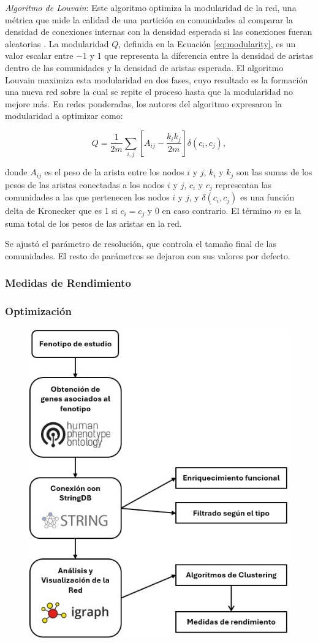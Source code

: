 \textit{Algoritmo de Louvain}: Este algoritmo optimiza la modularidad de la red, una métrica que mide la calidad de una partición en comunidades al comparar la densidad de conexiones internas con la densidad esperada si las conexiones fueran aleatorias \cite{Blondel2008Louvain}. La modularidad \( Q \), definida en la Ecuación \ref{eq:modularity}, es un valor escalar entre \(-1\) y \(1\) que representa la diferencia entre la densidad de aristas dentro de las comunidades y la densidad de aristas esperada. El algoritmo Louvain maximiza esta modularidad en dos fases, cuyo resultado es la formación una nueva red sobre la cual se repite el proceso hasta que la modularidad no mejore más. En redes ponderadas, los autores del algoritmo expresaron la modularidad a optimizar como:

\begin{equation}
	\label{eq:modularity}
	Q = \frac{1}{2m} \sum_{i,j} \left[ A_{ij} - \frac{k_i k_j}{2m} \right] \delta(c_i, c_j),
\end{equation}

\noindent donde \( A_{ij} \) es el peso de la arista entre los nodos \( i \) y \( j \), \( k_i \) y \( k_j \) son las sumas de los pesos de las aristas conectadas a los nodos \( i \) y \( j \), \( c_i \) y \( c_j \) representan las comunidades a las que pertenecen los nodos \( i \) y \( j \), y \( \delta(c_i, c_j) \) es una función delta de Kronecker que es 1 si \( c_i = c_j \) y 0 en caso contrario. El término \( m \) es la suma total de los pesos de las aristas en la red.

\noindent Se ajustó el parámetro de resolución, que controla el tamaño final de las comunidades. El resto de parámetros se dejaron con sus valores por defecto.

\subsubsection*{Medidas de Rendimiento}

\subsubsection*{Optimización}

\begin{figure}[h]
	\centering
	\includegraphics[width=0.75\linewidth]{figures/methods/flujo_trabajo.png}
	\caption{}
	\label{fig:flujo_trabajo}
\end{figure}
